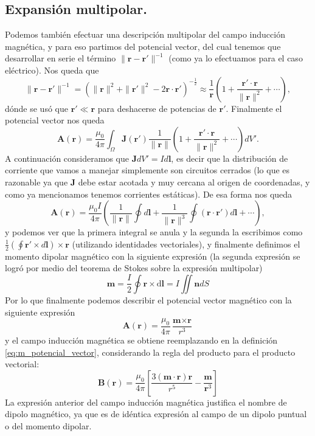 \documentclass[11pt,a4paper]{article}
\numberwithin{equation}{section}
\begin{document}
\subsection{Expansión multipolar.}
Podemos también efectuar una descripción multipolar del campo inducción magnética, y para eso partimos del potencial vector, del cual tenemos que desarrollar en serie el término $\|\textbf{r} - \textbf{r}'\|^{-1}$ (como ya lo efectuamos para el caso eléctrico). Nos queda que \[\|\textbf{r} - \textbf{r}'\|^{-1} = (\|\textbf{r}\|^2 + \|\textbf{r}'\|^2 - 2 \textbf{r} \cdot \textbf{r}')^{-\frac{1}{2}} \approx \frac{1}{\textbf{r}} \left(1 + \frac{\textbf{r}' \cdot \textbf{r}}{\|\textbf{r}\|^2} + \cdots\right),\] dónde se usó que $\textbf{r}' \ll \textbf{r}$ para deshacerse de potencias de $\textbf{r}'$. Finalmente el potencial vector nos queda \[\textbf{A}(\textbf{r}) = \frac{\mu_0}{4\pi} \int_{\Omega} \textbf{J}(\textbf{r}') \frac{1}{\|\textbf{r}\|} \left(1 + \frac{\textbf{r}' \cdot \textbf{r}}{\|\textbf{r}\|^2} + \cdots \right)dV'.\] A continuación consideramos que $\textbf{J} dV' = I d\textbf{l}$, es decir que la distribución de corriente que vamos a manejar simplemente son circuitos cerrados (lo que es razonable ya que $\textbf{J}$ debe estar acotada y muy cercana al origen de coordenadas, y como ya mencionamos tenemos corrientes estáticas). De esa forma nos queda \[\textbf{A}(\textbf{r}) = \frac{\mu_0 I}{4\pi} \left(\frac{1}{\|\textbf{r}\|}\oint d\textbf{l} + \frac{1}{\|\textbf{r}\|^3} \oint (\textbf{r} \cdot \textbf{r}') d\textbf{l} + \cdots \right),\] y podemos ver que la primera integral se anula y la segunda la escribimos como $\displaystyle \frac{1}{2}\left(\oint \textbf{r}' \times d\textbf{l}\right) \times \textbf{r}$ (utilizando identidades vectoriales), y finalmente definimos el momento dipolar magnético con la siguiente expresión (la segunda expresión se logró por medio del teorema de Stokes sobre la expresión multipolar)
\begin{equation}
    \textbf{m} = \frac{I}{2} \oint \textbf{r} \times \mathrm{d}\textbf{l} = I \iint \textbf{n} dS
    \label{eq:m_dipolo}
\end{equation}
Por lo que finalmente podemos describir el potencial vector magnético con la siguiente expresión
\begin{equation}
    \textbf{A}(\textbf{r}) = \frac{\mu_0}{4\pi}\frac{\textbf{m}\times\textbf{r}}{r^{3}}
    \label{eq:m_potencial_multipolar}
\end{equation}
y el campo inducción magnética se obtiene reemplazando en la definición \ref{eq:m_potencial_vector}, considerando la regla del producto para el producto vectorial:
\begin{equation}
    \textbf{B}(\textbf{r}) = \frac{\mu_0}{4\pi}\left[\frac{3(\textbf{m}\cdot\textbf{r})\textbf{r}}{r^{5}}-\frac{\textbf{m}}{\textbf{r}^3}\right]
    \label{eq:m_induccion_multipolar}
\end{equation}
La expresión anterior del campo inducción magnética justifica el nombre de dipolo magnético, ya que es de idéntica expresión al campo de un dipolo puntual o del momento dipolar.
\end{document}
